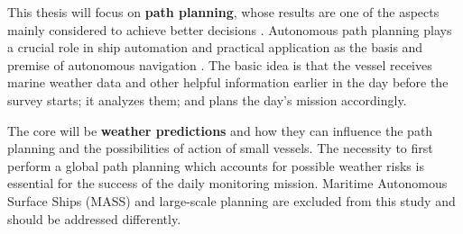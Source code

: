 This thesis will focus on \textbf{path planning}, whose results are one of the aspects mainly considered to achieve better decisions \cite{9564580}. Autonomous path planning plays a crucial role in ship automation and practical application as the basis and premise of autonomous navigation \cite{s20020426, vagale2021path}. The basic idea is that the vessel receives marine weather data and other helpful information earlier in the day before the survey starts; it analyzes them; and plans the day's mission accordingly.

The core will be \textbf{weather predictions} and how they can influence the path planning and the possibilities of action of small vessels. The necessity to first perform a global path planning which accounts for possible weather risks is essential for the success of the daily monitoring mission. Maritime Autonomous Surface Ships (MASS) and large-scale planning are excluded from this study and should be addressed differently. 




